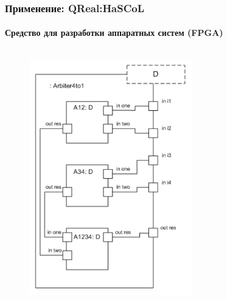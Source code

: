 \documentclass[14pt]{beamer}
\begin{document}
\begin{frame}
\begin{columns}[onlytextwidth]
\begin{column}{0.5\textwidth}
\begin{figure}
\begin{center}
            	\end{center}
            \end{figure}
        \end{column}
    \end{columns}
\end{frame}

\begin{frame}
    \frametitle{Применение: QReal:HaSCoL}
    \framesubtitle{Средство для разработки аппаратных систем (FPGA)}
    \begin{columns}[onlytextwidth]
       \begin{column}{0.35\textwidth}
            \begin{figure}
            	\begin{center}
             		\includegraphics[width=0.8\textwidth]{images/presentation/hascol1.png}\\
            	\end{center}
            \end{figure}
        \end{column}
        \begin{column}{0.65\textwidth}
            \begin{figure}

\end{figure}
\end{column}
\end{columns}
\end{frame}
\end{document}
